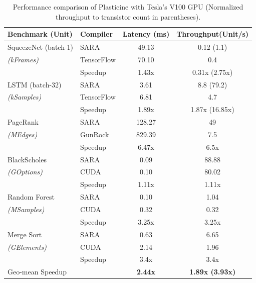 \newcommand{\mrow}[1]{\multirow{2}{*}{#1}}
\begin{table}[t]
  \centering
    \footnotesize
    \begin{tabular}{llcc}
    \toprule
      \textbf{Benchmark} (Unit)       & \textbf{Compiler} & {\bf Latency }(ms) & {\bf Throughput}(Unit/s)     \\
      \midrule
        SqueezeNet (batch-1)   & SARA                & 49.13          & 0.12 (1.1)           \\
        {\em (kFrames)}        & TensorFlow          & 70.10          & 0.4                  \\
                               & Speedup             & 1.43x          & 0.31x (2.75x)          \\ \addlinespace
        LSTM (batch-32)         & SARA                & 3.61           & 8.8 (79.2)           \\
        {\em (kSamples)}       & TensorFlow          & 6.81           & 4.7                  \\
                               & Speedup             & 1.89x          & 1.87x (16.85x)         \\ \addlinespace
        PageRank               & SARA                & 128.27         & 49                   \\
        {\em (MEdges)}         & GunRock             & 829.39         & 7.5                  \\
                               & Speedup             & 6.47x          & 6.5x                  \\ \addlinespace
        BlackScholes           & SARA                & 0.09           & 88.88                \\
        {\em (GOptions)}       & CUDA                & 0.10           & 80.02                \\
                               & Speedup             & 1.11x          & 1.11x                 \\ \addlinespace
        Random Forest          & SARA                & 0.10           & 1.04                 \\
        {\em (MSamples)}       & CUDA                & 0.32           & 0.32                 \\
                               & Speedup             & 3.25x          & 3.25x                 \\ \addlinespace
        Merge Sort             & SARA                & 0.63           & 6.65                 \\
        {\em (GElements)}      & CUDA                & 2.14           & 1.96                 \\
                               & Speedup             & 3.4x           & 3.4x                 \\
      \midrule
      Geo-mean Speedup         &                     & \textbf{2.44x} & \textbf{1.89x (3.93x)} \\
      \bottomrule
    \end{tabular}
  \caption{Performance comparison of Plasticine with Tesla's V100 GPU (Normalized throughput to transistor count in parentheses).}
  \label{tab:gpu-comparison}
\end{table}

